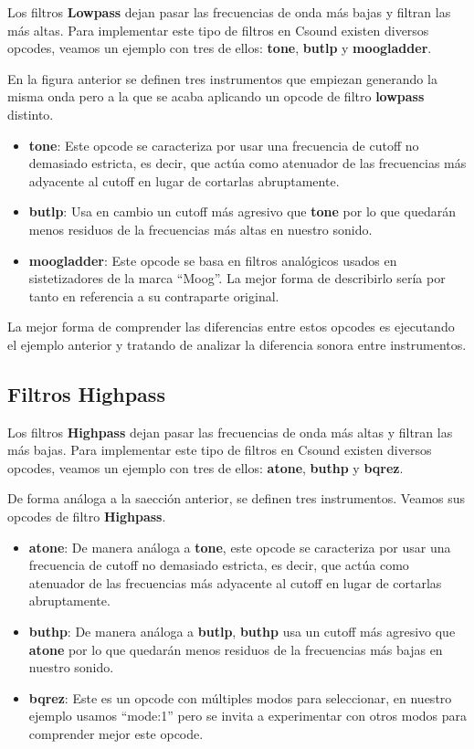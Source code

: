 Los filtros \textbf{Lowpass} dejan pasar las frecuencias de onda más bajas y filtran las más altas. Para implementar este tipo de filtros en Csound existen diversos opcodes, veamos un ejemplo con tres de ellos: \textbf{tone}, \textbf{butlp} y \textbf{moogladder}.


En la figura anterior se definen tres instrumentos que empiezan generando la misma onda pero a la que se acaba aplicando un opcode de filtro \textbf{lowpass} distinto.

\begin{itemize}
 \item \textbf{tone}: Este opcode se caracteriza por usar una frecuencia de cutoff no demasiado estricta, es decir, que actúa como atenuador de las frecuencias más adyacente al cutoff en lugar de cortarlas abruptamente.
 \item \textbf{butlp}: Usa en cambio un cutoff más agresivo que \textbf{tone} por lo que quedarán menos residuos de la frecuencias más altas en nuestro sonido.
 \item \textbf{moogladder}: Este opcode se basa en filtros analógicos usados en sistetizadores de la marca ``Moog''. La mejor forma de describirlo sería por tanto en referencia a su contraparte original.
\end{itemize}

La mejor forma de comprender las diferencias entre estos opcodes es ejecutando el ejemplo anterior y tratando de analizar la diferencia sonora entre instrumentos.

\subsection{Filtros Highpass}

Los filtros \textbf{Highpass} dejan pasar las frecuencias de onda más altas y filtran las más bajas. Para implementar este tipo de filtros en Csound existen diversos opcodes, veamos un ejemplo con tres de ellos: \textbf{atone}, \textbf{buthp} y \textbf{bqrez}.


De forma análoga a la saección anterior, se definen tres instrumentos. Veamos sus opcodes de filtro \textbf{Highpass}.
\pagebreak
\begin{itemize}
 \item \textbf{atone}: De manera análoga a \textbf{tone}, este opcode se caracteriza por usar una frecuencia de cutoff no demasiado estricta, es decir, que actúa como atenuador de las frecuencias más adyacente al cutoff en lugar de cortarlas abruptamente.
 \item \textbf{buthp}: De manera análoga a \textbf{butlp}, \textbf{buthp} usa un cutoff más agresivo que \textbf{atone} por lo que quedarán menos residuos de la frecuencias más bajas en nuestro sonido.
 \item \textbf{bqrez}: Este es un opcode con múltiples modos para seleccionar, en nuestro ejemplo usamos ``mode:1'' pero se invita a experimentar con otros modos para comprender mejor este opcode.
\end{itemize}

